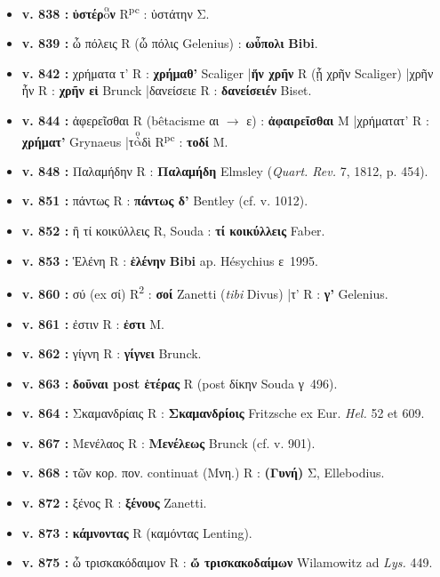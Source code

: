 \documentclass[10pt, a4paper, twoside]{book}
\renewcommand{\_}{\origunderscore\penalty0\relax}
\providecommand{\italique}[1]{\emph{#1}}
\providecommand{\lecon}[1]{\textbf{#1}}
\providecommand{\expo}[1]{\textsuperscript{#1}}
\providecommand{\Rpc}{R\expo{pc}}
\providecommand{\Rdeux}{R\expo{2}}
\providecommand{\Mon}{M}
\providecommand{\espApp}{\hspace{0.5em}|\hspace{0.5em}}
\providecommand{\auDessus}[2]{\ensuremath{\overset{\text{#2}}{\text{#1}}}}
\begin{document}
\begin{itemize}
  \begin{itemize}
    \item \textbf{v. 838 :} \lecon{ὑστέρ\auDessus{ο}{α}ν} \Rpc{} : ὑστάτην Σ.
    \item \textbf{v. 839 :} ὦ πόλεις R (ὦ πόλις Gelenius) : \lecon{ωὖπολι} \lecon{Bibi}.
    \item \textbf{v. 842 :} χρήματα τ' R : \lecon{χρήμαθ'} Scaliger \espApp \lecon{ἥν χρῆν} R (ᾗ χρῆν Scaliger) \espApp χρῆν ἦν R : \lecon{χρῆν εἰ} Brunck \espApp δανείσειε R : \lecon{δανείσειέν} Biset.
    \item \textbf{v. 844 :} ἀφερεῖσθαι R (bêtacisme αι $\to$ ε) : \lecon{ἀφαιρεῖσθαι} \Mon{} \espApp χρήματατ' R : \lecon{χρήματ'} Grynaeus \espApp τ\auDessus{ὰ}{ο}δὶ \Rpc{} : \lecon{τοδί} \Mon{}.
    \item \textbf{v. 848 :} Παλαμήδην R : \lecon{Παλαμήδη} Elmsley (\italique{Quart. Rev.} 7, 1812, p. 454).
    \item \textbf{v. 851 :} πάντως R : \lecon{πάντως δ'} Bentley (cf. v. 1012).
    \item \textbf{v. 852 :} ἢ τί κοικύλλεις R, Souda : \lecon{τί κοικύλλεις} Faber.
    \item \textbf{v. 853 :} Ἑλένη R : \lecon{ἑλένην} \lecon{Bibi} ap. Hésychius ε~1995.
    \item \textbf{v. 860 :} σύ (ex σί) \Rdeux{} : \lecon{σοί} Zanetti (\italique{tibi} Divus) \espApp τ' R : \lecon{γ'} Gelenius.
    \item \textbf{v. 861 :} ἐστιν R : \lecon{ἐστι} \Mon{}.
    \item \textbf{v. 862 :} γίγνη R : \lecon{γίγνει} Brunck.
    \item \textbf{v. 863 :} \textbf{δοῦναι post ἑτέρας} R (post δίκην Souda γ~496).
    \item \textbf{v. 864 :} Σκαμανδρίαις R : \lecon{Σκαμανδρίοις} Fritzsche ex Eur. \italique{Hel.} 52 et 609.
    \item \textbf{v. 867 :} Μενέλαος R : \lecon{Μενέλεως} Brunck (cf. v. 901).
    \item \textbf{v. 868 :} τῶν κορ. πον. continuat (Μνη.) R : \lecon{(Γυνή)} Σ, Ellebodius.
    \item \textbf{v. 872 :} ξένος R : \lecon{ξένους} Zanetti.
    \item \textbf{v. 873 :} \lecon{κάμνοντας} R (καμόντας Lenting).
    \item \textbf{v. 875 :} ὦ τρισκακόδαιμον R : \lecon{ὤ τρισκακοδαίμων} Wilamowitz ad \italique{Lys.} 449.
  \end{itemize}
\end{itemize}
\end{document}
